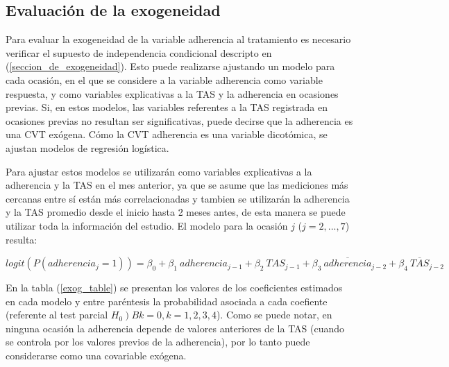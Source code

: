 \documentclass[spanish]{article}
\numberwithin{figure}{subsection}
\numberwithin{equation}{subsection}
\numberwithin{table}{subsection}
\begin{document}
\subsection{Evaluación de la exogeneidad}
\label{evaluacion de la exogeneidad}

Para evaluar la exogeneidad de la variable adherencia al tratamiento es
necesario verificar el supuesto de independencia condicional descripto en
(\ref{seccion_de_exogeneidad}). Esto puede realizarse ajustando un modelo para
cada ocasión, en el que se considere a la variable adherencia como variable
respuesta, y como variables explicativas a la TAS y la adherencia en ocasiones
previas. Si, en estos modelos, las variables referentes a la TAS registrada en
ocasiones previas no resultan ser significativas, puede decirse que la
adherencia es una CVT exógena. Cómo la CVT adherencia es una variable
dicotómica, se ajustan modelos de regresión logística.

Para ajustar estos modelos se utilizarán como variables explicativas a la
adherencia y la TAS en el mes anterior, ya que se asume que las mediciones más
cercanas entre sí están más correlacionadas y tambien se utilizarán la
adherencia y la TAS promedio desde el inicio hasta 2 meses antes, de esta manera
se puede utilizar toda la información del estudio. El modelo para la ocasión $j$
($j = 2, ..., 7$) resulta:

$ 
	logit(P(adherencia_j=1)) = \beta_0 + \beta_1\ adherencia_{j-1} + \beta_2\ TAS_{j-1}
	+ \beta_3\ \overline{adherencia}_{j-2} + \beta_4\ \overline{TAS}_{j-2}
$

En la tabla (\ref{exog_table}) se presentan los valores de los coeficientes
estimados en cada modelo y entre paréntesis la probabilidad asociada a cada
coefiente (referente al test parcial $\left. H_0\right) Bk=0, k = 1, 2, 3, 4$).
Como se puede notar, en ninguna ocasión la adherencia depende de valores
anteriores de la TAS (cuando se controla por los valores previos de la
adherencia), por lo tanto puede considerarse como una covariable exógena.
\end{document}
